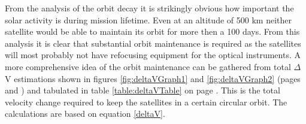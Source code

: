 From the analysis of the orbit decay it is strikingly obvious how important the solar activity is during mission lifetime. Even at an altitude of 500 km neither satellite would be able to maintain its orbit for more then a 100 days. From this analysis it is clear that substantial orbit maintenance is required as the satellites will most probably not have refocusing equipment for the optical instruments. A more comprehensive idea of the orbit maintenance can be gathered from total $\Delta$V estimations shown in figures \ref{fig:deltaVGraph1} and \ref{fig:deltaVGraph2} (pages \pageref{fig:deltaVGraph1} and \pageref{fig:deltaVGraph2}) and tabulated in table \ref{table:deltaVTable} on page \pageref{table:deltaVTable}. This is the total velocity change required to keep the satellites in a certain circular orbit. The calculations are based on equation \ref{deltaV}.

